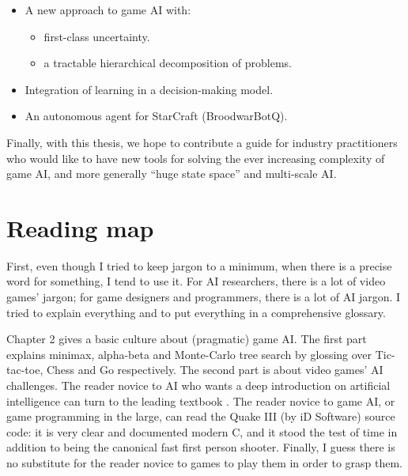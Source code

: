 \begin{itemize}
\item A new approach to game AI with:
\begin{itemize}
\item first-class uncertainty.
\item a tractable hierarchical decomposition of problems.
\end{itemize}
\item Integration of learning in a decision-making model. 
\item An autonomous agent for StarCraft (BroodwarBotQ).
\end{itemize}

Finally, with this thesis, we hope to contribute a guide for industry practitioners who would like to have new tools for solving the ever increasing complexity of game AI, and more generally ``huge state space'' and multi-scale AI.




\section{Reading map}
First, even though I tried to keep jargon to a minimum, when there is a precise word for something, I tend to use it. For AI researchers, there is a lot of video games' jargon; for game designers and programmers, there is a lot of AI jargon. I tried to explain everything and to put everything in a comprehensive glossary.

Chapter 2 gives a basic culture about (pragmatic) game AI. The first part explains minimax, alpha-beta and Monte-Carlo tree search by glossing over Tic-tac-toe, Chess and Go respectively. The second part is about video games' AI challenges. The reader novice to AI who wants a deep introduction on artificial intelligence can turn to the leading textbook \citep{AIMA}. The reader novice to game AI, or game programming in the large, can read the Quake III (by iD Software) source code: it is very clear and documented modern C, and it stood the test of time in addition to being the canonical fast first person shooter. Finally, I guess there is no substitute for the reader novice to games to play them in order to grasp them.

